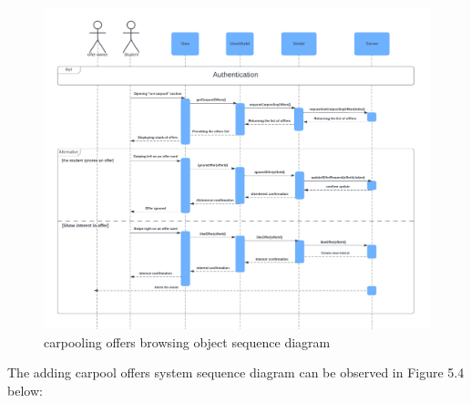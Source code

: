 \begin{figure}[H] 
            \centering
            \includegraphics[scale=0.45]{diagrams/Sequence diagram object carpool browsing.png}
            \caption{carpooling offers browsing object sequence diagram} 
            \label{fig: carpooling offers browsing object sequence diagram }
\end{figure}

The adding carpool offers system sequence diagram can be observed in Figure 5.4 below:

